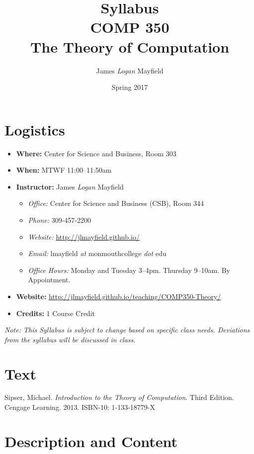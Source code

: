 \documentclass[10pt]{article}
\title{Syllabus \\ COMP 350 \\ The Theory of Computation}
\author{ James \textit{Logan} Mayfield }
\date{ Spring 2017 }
\begin{document}
\maketitle

\section{Logistics}
\begin{itemize}
\item \textbf{Where: } Center for Science and Business, Room 303
\item \textbf{When: } MTWF 11:00--11:50am
\item \textbf{Instructor: } James \textit{Logan} Mayfield\begin{itemize}
\item \textit{Office: } Center for Science and Business (CSB), Room 344
\item \textit{Phone: } 309-457-2200 %
\item \textit{Website: } \url{http://jlmayfield.github.io/}
\item \textit{Email: } lmayfield \textit{at} monmouthcollege \textit{dot} edu
\item \textit{Office Hours: }  Monday and Tuesday 3--4pm. Thursday 9--10am. By Appointment.
\end{itemize}
\item \textbf{Website: } \url{http://jlmayfield.github.io/teaching/COMP350-Theory/}
\item \textbf{Credits: } 1 Course Credit
\end{itemize}
\emph{Note: This Syllabus is subject to change based on specific class needs. Deviations from the syllabus will be discussed in class.}


\section{Text}

Sipser, Michael. \textit{Introduction to the Theory of Computation}. Third Edition. Cengage Learning. 2013. ISBN-10: 1-133-18779-X %


\section{Description and Content}
\end{document}
